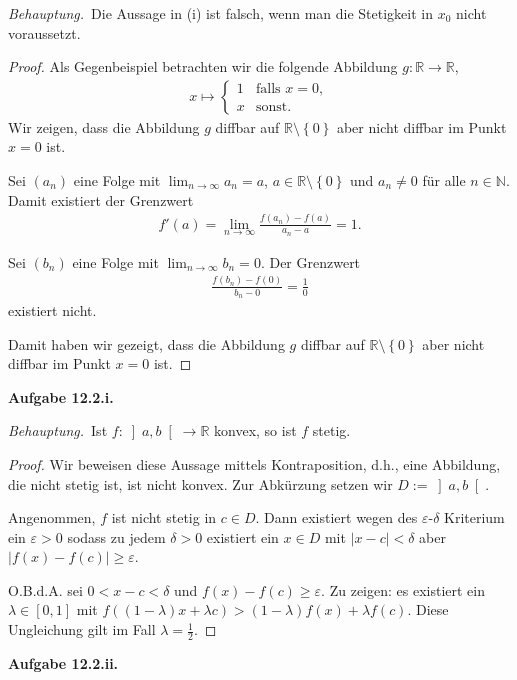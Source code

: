 \documentclass[12pt]{extarticle}
\newcommand{\beh}{\textit{Behauptung.}\ }
\newcommand{\aufgn}[1]{\textbf{Aufgabe #1.}}
\newcommand{\mg}[1]{\mathbb{#1}}
\begin{document}
\beh Die Aussage in (i) ist falsch, wenn man die
Stetigkeit in \(x_0\) nicht voraussetzt.

\begin{proof}
Als Gegenbeispiel betrachten wir die folgende Abbildung
\(g \colon \mg{R} \to \mg{R}\),
\begin{align*}
  x \mapsto
\begin{cases}
  1 & \text{falls } x = 0, \\
  x & \text{sonst.}
\end{cases}
\end{align*}
Wir zeigen, dass die Abbildung \(g\) diffbar auf $\mg{R}
\setminus \left\{ 0 \right\}$ aber nicht diffbar im
Punkt \(x = 0\) ist.

Sei \((a_n)\) eine Folge mit
\(\lim_{n \to \infty}{a_n} = a\),
\(a \in \mg{R} \setminus \left\{ 0 \right\}\) und
\(a_n \ne 0\) für alle \(n \in \mg{N}\).  Damit existiert
der Grenzwert
\begin{align*}
f'(a) = \lim_{n \to \infty}{\frac{f(a_n) - f(a)}{a_n -
  a}} = 1.
\end{align*}

Sei \((b_n)\) eine Folge mit
\(\lim_{n \to \infty}{b_n} = 0\). Der Grenzwert
\begin{align*}
  \frac{f(b_n) - f(0)}{b_n -  0} = \frac{1}{0}
\end{align*}
existiert nicht.

Damit haben wir gezeigt, dass die Abbildung \(g\) diffbar
auf \(\mg{R} \setminus \left\{ 0 \right\}\) aber nicht
diffbar im Punkt \(x = 0\) ist.
\end{proof}

\aufgn{12.2.i}

\beh Ist \(f \colon \left] a, b \right[ \to \mg{R}\)
konvex, so ist \(f\) stetig.

\begin{proof}
  Wir beweisen diese Aussage mittels Kontraposition,
  d.h., eine Abbildung, die nicht stetig ist, ist nicht
  konvex.  Zur Abkürzung setzen wir
  \(D := \left] a, b \right[\).

  Angenommen, \(f\) ist nicht stetig in \(c \in D\).  Dann
  existiert wegen des \(\varepsilon\)-\(\delta\) Kriterium
  ein \(\varepsilon > 0\) sodass zu jedem \(\delta > 0\)
  existiert ein \(x \in D\) mit
  \(\left| x - c \right| < \delta\) aber
  \(\left| f(x) - f(c) \right| \ge \varepsilon\).

  O.B.d.A. sei \(0 < x - c < \delta\) und
  \(f(x) - f(c) \ge \varepsilon\). Zu zeigen: es existiert
  ein \(\lambda \in \left[ 0, 1 \right]\) mit $f((1 -
  \lambda) x + \lambda c) > (1 - \lambda) f(x) +
  \lambda f(c)$.  Diese Ungleichung gilt im Fall
  \(\lambda = \frac{1}{2}\).


\end{proof}
\aufgn{12.2.ii}
\end{document}
